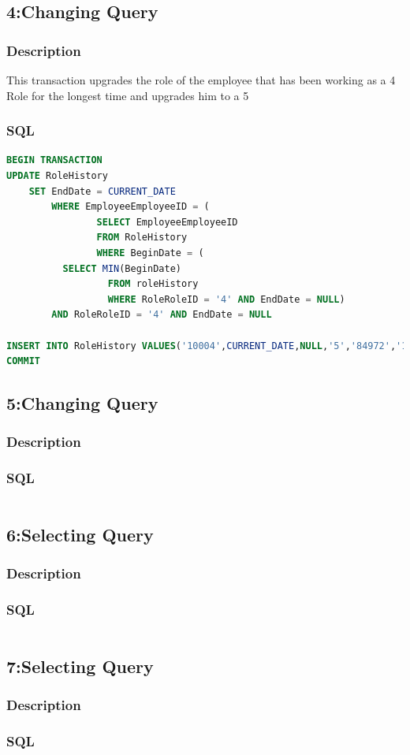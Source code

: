 \documentclass[a4paper, 10pt]{article}
\begin{document}
\subsection{4:Changing Query}
\subsubsection{Description}
This transaction upgrades the role of the employee that has been working as a 4 Role for the longest time and upgrades him to a 5

\subsubsection{SQL}
\begin{lstlisting}[language=SQL]
BEGIN TRANSACTION
UPDATE RoleHistory
	SET EndDate = CURRENT_DATE
		WHERE EmployeeEmployeeID = (
				SELECT EmployeeEmployeeID 
				FROM RoleHistory
				WHERE BeginDate = (
          SELECT MIN(BeginDate)
				  FROM roleHistory
				  WHERE RoleRoleID = '4' AND EndDate = NULL)
        AND RoleRoleID = '4' AND EndDate = NULL

INSERT INTO RoleHistory VALUES('10004',CURRENT_DATE,NULL,'5','84972','16516');
COMMIT
\end{lstlisting}

\subsection{5:Changing Query}
\subsubsection{Description}

\subsubsection{SQL}
\begin{lstlisting}[language=SQL]
\end{lstlisting}

\subsection{6:Selecting Query}
\subsubsection{Description}
\subsubsection{SQL}
\begin{lstlisting}[language=SQL]
\end{lstlisting}

\subsection{7:Selecting Query}
\subsubsection{Description}
\subsubsection{SQL}
\begin{lstlisting}[language=SQL]
\end{lstlisting}
\end{document}
